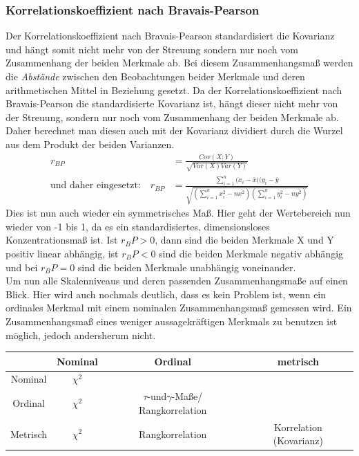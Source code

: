 \documentclass[a4paper]{article}
\begin{document}
\subsubsection{Korrelationskoeffizient nach Bravais-Pearson}\label{sec:cor-bp}
Der Korrelationskoeffizient nach Bravais-Pearson standardisiert die Kovarianz und hängt somit nicht mehr von der Streuung sondern nur noch vom Zusammenhang der beiden Merkmale ab. Bei diesem Zusammenhangsmaß werden die \textit{Abstände} zwischen den Beobachtungen beider Merkmale und deren arithmetischen Mittel in Beziehung gesetzt. Da der Korrelationskoeffizient nach Bravais-Pearson die standardisierte Kovarianz ist, hängt dieser nicht mehr von der Streuung, sondern nur noch vom Zusammenhang der beiden Merkmale ab. Daher berechnet man diesen auch mit der Kovarianz dividiert durch die Wurzel aus dem Produkt der beiden Varianzen. 
\begin{align*}
    r_{BP}&=\frac{Cov(X;Y)}{\sqrt{Var(X)Var(Y)}} \\
    \mbox{und daher eingesetzt:}\quad
   r_{BP}&=\frac{\sum_{i=1}^n(x_i-\bar{x}((y_i-\bar{y}}{\sqrt{(\sum_{i=1}^nx_i^2-n\bar{x^2})(\sum_{i=1}^ny_i^2-n\bar{y^2})}}
\end{align*}
Dies ist nun auch wieder ein symmetrisches Maß.
Hier geht der Wertebereich nun wieder von -1 bis 1, da es ein standardisiertes, dimensionsloses Konzentrationsmaß ist. Ist $r_BP>0$, dann sind die beiden Merkmale X und Y positiv linear abhängig, ist $r_BP<0$ sind die beiden Merkmale negativ abhängig und bei $r_BP=0$ sind die beiden Merkmale unabhängig voneinander.\\
Um nun alle Skalenniveaus und deren passenden Zusammenhangsmaße auf einen Blick. Hier wird auch nochmals deutlich, dass es kein Problem ist, wenn ein ordinales Merkmal mit einem nominalen Zusammenhangsmaß gemessen wird. Ein Zusammenhangsmaß eines weniger aussagekräftigen Merkmals zu benutzen ist möglich, jedoch andersherum nicht.\\

\begin{tabular}{c|c|c|c}
&Nominal & Ordinal & metrisch\\
\hline
Nominal& $\chi^2$& & \\
Ordinal&$\chi^2$&$\tau$-und$\gamma$-Maße/ Rangkorrelation& \\
Metrisch &$\chi^2$& Rangkorrelation & Korrelation (Kovarianz) \\
\end{tabular}

\clearpage
\end{document}
